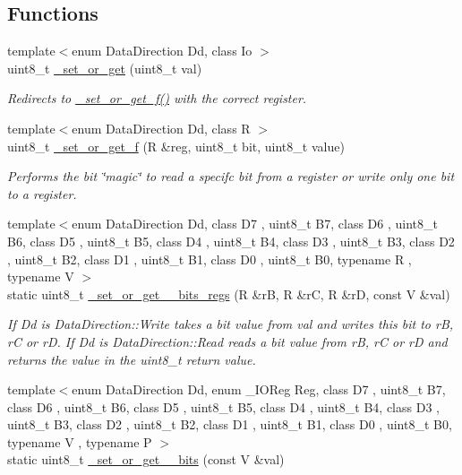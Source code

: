 \subsection*{Functions}
\begin{DoxyCompactItemize}
\item 
{\footnotesize template$<$enum Data\+Direction Dd, class Io $>$ }\\uint8\+\_\+t \hyperlink{namespaceports_aa339a9d178cb414c4cf243450d5887d2}{\+\_\+set\+\_\+or\+\_\+get} (uint8\+\_\+t val)
\begin{DoxyCompactList}\small\item\em Redirects to \hyperlink{namespaceports_a75686ee2e9a291c0095dec6d73e4af8d}{\+\_\+set\+\_\+or\+\_\+get\+\_\+f()} with the correct register. \end{DoxyCompactList}\item 
{\footnotesize template$<$enum Data\+Direction Dd, class R $>$ }\\uint8\+\_\+t \hyperlink{namespaceports_a75686ee2e9a291c0095dec6d73e4af8d}{\+\_\+set\+\_\+or\+\_\+get\+\_\+f} (R \&reg, uint8\+\_\+t bit, uint8\+\_\+t value)
\begin{DoxyCompactList}\small\item\em Performs the bit \char`\"{}magic\char`\"{} to read a specifc bit from a register or write only one bit to a register. \end{DoxyCompactList}\item 
{\footnotesize template$<$enum Data\+Direction Dd, class D7 , uint8\+\_\+t B7, class D6 , uint8\+\_\+t B6, class D5 , uint8\+\_\+t B5, class D4 , uint8\+\_\+t B4, class D3 , uint8\+\_\+t B3, class D2 , uint8\+\_\+t B2, class D1 , uint8\+\_\+t B1, class D0 , uint8\+\_\+t B0, typename R , typename V $>$ }\\static uint8\+\_\+t \hyperlink{namespaceports_a541ed8a2807f6d65c80cdf90cd7106eb}{\+\_\+set\+\_\+or\+\_\+get\+\_\+\_\+bits\+\_\+regs} (R \&rB, R \&rC, R \&rD, const V \&val)
\begin{DoxyCompactList}\small\item\em If Dd is Data\+Direction\+::\+Write takes a bit value from {\ttfamily val} and writes this bit to {\ttfamily rB}, {\ttfamily rC} or {\ttfamily rD}. If {\ttfamily Dd} is Data\+Direction\+::\+Read reads a bit value from {\ttfamily rB}, {\ttfamily rC} or {\ttfamily rD} and returns the value in the {\ttfamily uint8\+\_\+t} return value. \end{DoxyCompactList}\item 
{\footnotesize template$<$enum Data\+Direction Dd, enum \+\_\+\+I\+O\+Reg Reg, class D7 , uint8\+\_\+t B7, class D6 , uint8\+\_\+t B6, class D5 , uint8\+\_\+t B5, class D4 , uint8\+\_\+t B4, class D3 , uint8\+\_\+t B3, class D2 , uint8\+\_\+t B2, class D1 , uint8\+\_\+t B1, class D0 , uint8\+\_\+t B0, typename V , typename P $>$ }\\static uint8\+\_\+t \hyperlink{namespaceports_ada41109199590d9ccafae0f6d2adaf99}{\+\_\+set\+\_\+or\+\_\+get\+\_\+\_\+bits} (const V \&val)

\end{DoxyCompactItemize}
